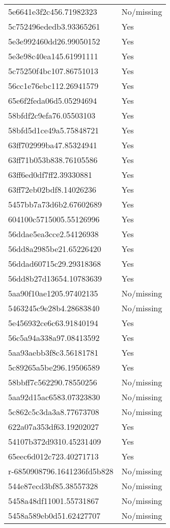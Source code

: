 \begin{tabular}{ll}
5e6641e3f2c456.71982323 & No/missing \\
5c752496ededb3.93365261 & Yes \\
5e3e992460dd26.99050152 & Yes \\
5e3e98c40ea145.61991111 & Yes \\
5c75250f4bc107.86751013 & Yes \\
56cc1e76ebc112.26941579 & Yes \\
65e6f2feda06d5.05294694 & Yes \\
58bfdf2c9efa76.05503103 & Yes \\
58bfd5d1ce49a5.75848721 & Yes \\
63ff702999ba47.85324941 & Yes \\
63ff71b053b838.76105586 & Yes \\
63ff6ed0df7ff2.39330881 & Yes \\
63ff72eb02bdf8.14026236 & Yes \\
5457bb7a73d6b2.67602689 & Yes \\
604100c5715005.55126996 & Yes \\
56ddae5ea3cce2.54126938 & Yes \\
56dd8a2985be21.65226420 & Yes \\
56ddad60715c29.29318368 & Yes \\
56dd8b27d13654.10783639 & Yes \\
5aa90f10ae1205.97402135 & No/missing \\
5463245c9e28b4.28683840 & No/missing \\
5e456932ce6c63.91840194 & Yes \\
56c5a94a338a97.08413592 & Yes \\
5aa93aebb3f8c3.56181781 & Yes \\
5c89265a5be296.19506589 & Yes \\
58bbff7c562290.78550256 & No/missing \\
5aa92d15ac6583.07323830 & No/missing \\
5c862c5c3da3a8.77673708 & No/missing \\
622a07a353df63.19202027 & Yes \\
54107b372d9310.45231409 & Yes \\
65eec6d012c723.40271713 & Yes \\
r-6850908796.1641236fd5b828 & No/missing \\
544e87ecd3bf85.38557328 & No/missing \\
5458a48df11001.55731867 & No/missing \\
5458a589eb0d51.62427707 & No/missing \\

\end{tabular}

